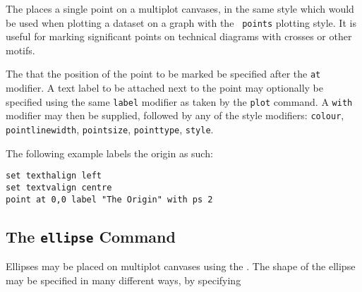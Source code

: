 The  places a single point on a multiplot canvases, in the same
style which would be used when plotting a dataset on a graph with the {\tt
points} plotting style. It is useful for marking significant points on
technical diagrams with crosses or other motifs.

The  that the position of the point to be marked be specified
after the {\tt at} modifier. A text label to be attached next to the point may
optionally be specified using the same {\tt label} modifier as taken by the
{\tt plot} command. A {\tt with} modifier may then be supplied, followed by any
of the style modifiers: {\tt colour}, {\tt pointlinewidth}, {\tt pointsize},
{\tt pointtype}, {\tt style}.

The following example labels the origin as such:
\begin{verbatim}
set texthalign left
set textvalign centre
point at 0,0 label "The Origin" with ps 2
\end{verbatim}

\subsection{The {\tt ellipse} Command}
\label{sec:ellipse}

Ellipses may be placed on multiplot canvases using the . The
shape of the ellipse may be specified in many different ways, by specifying


